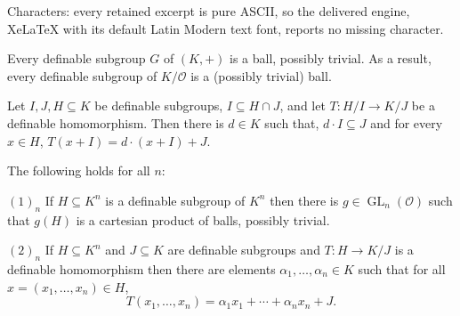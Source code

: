 \documentclass[10pt,a4paper]{amsart}
\DeclareMathOperator{\gl}{GL} \DeclareMathOperator{\agl}{AGL}
\newcommand{\CO}{{\mathcal O}}
\begin{document}
Characters: every retained excerpt is pure ASCII, so the delivered engine, XeLaTeX with its default Latin Modern text font, reports no missing character.
\begin{lemma}\label{L:definable subgroup of K or K/O is a ball}
Every  definable subgroup $G$ of $(K,+)$ is a ball, possibly trivial.  As a result, every definable subgroup of $K/\CO$ is a (possibly trivial) ball.
\end{lemma}

\begin{lemma}\label{a general lemma}
Let $I,J, H\subseteq K$ be definable subgroups, $I\subseteq H\cap  J$, and let $T:H/I\to K/J$ be a definable homomorphism.
Then there is $d\in K$ such that, $d\cdot I\subseteq J$ and for every $x\in H$,  $T(x+I)=d\cdot (x+I)+J$.
\end{lemma}

\begin{lemma} \label{end-groups2}
The following holds for all  $n$:

$(1)_n$ If $H\subseteq K^n$ is a definable subgroup of $K^n$ then there is $g\in \gl_n(\CO)$ such that $g(H)$ is a cartesian product  of balls, possibly trivial. 

$(2)_n$ If $H\subseteq K^n$ and $J\subseteq K$ are definable subgroups and $T:H\to K/J$ is a definable homomorphism then there are elements $\alpha_1,\ldots, \alpha_n\in K$ such that for all $x=(x_1,\ldots, x_n)\in H$, 
\[T(x_1,\ldots,x_n)=\alpha_1x_1+\cdots+\alpha_nx_n+J.\]
\end{lemma}
\end{document}
